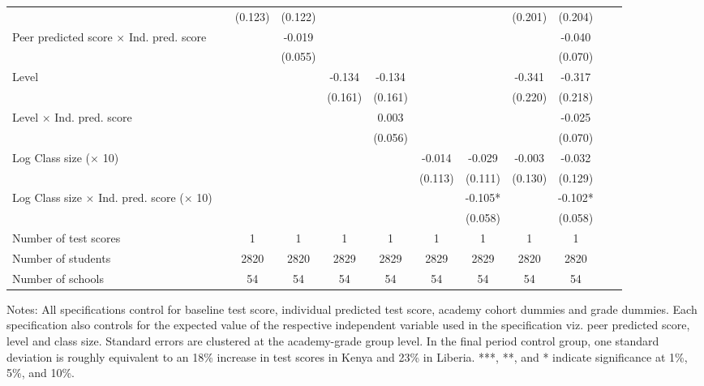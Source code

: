 \begin{center}
\begin{scriptsize}
\begin{threeparttable}
\begin{tabular} {@{} l l c c c c c c c c c c  @{}}
                 &  & (0.123) & (0.122) &  &  &  &  & (0.201) & (0.204) \\
Peer predicted score $\times$ Ind. pred. score &  &  & -0.019 &  &  &  &  &  & -0.040 \\
                 &  &  & (0.055) &  &  &  &  &  & (0.070) \\
Level &  &  &  & -0.134 & -0.134 &  &  & -0.341 & -0.317 \\
                 &  &  &  & (0.161) & (0.161) &  &  & (0.220) & (0.218) \\
Level $\times$ Ind. pred. score &  &  &  &  & 0.003 &  &  &  & -0.025 \\
                 &  &  &  &  & (0.056) &  &  &  & (0.070) \\
Log Class size ($\times$ 10) &  &  &  &  &  & -0.014 & -0.029 & -0.003 & -0.032 \\
                 &  &  &  &  &  & (0.113) & (0.111) & (0.130) & (0.129) \\
Log Class size $\times$ Ind. pred. score ($\times$ 10) &  &  &  &  &  &  & -0.105* &  & -0.102* \\
                 &  &  &  &  &  &  & (0.058) &  & (0.058) \\
\midrule
Number of test scores &  & 1 & 1 & 1 & 1 & 1 & 1 & 1 & 1 \\
Number of students &  & 2820 & 2820 & 2829 & 2829 & 2829 & 2829 & 2820 & 2820 \\
Number of schools &  & 54 & 54 & 54 & 54 & 54 & 54 & 54 & 54 \\
\bottomrule
\end{tabular}
\begin{tablenotes}
\item Notes: All specifications control for baseline test score, individual predicted test score, academy cohort dummies and grade dummies. Each specification also controls for the expected value of the respective independent variable used in the specification viz. peer predicted score, level and class size. Standard errors are clustered at the academy-grade group level. In the final period control group, one standard deviation is roughly equivalent to an 18\% increase in test scores in Kenya and 23\% in Liberia. ***, **, and * indicate significance at 1\%, 5\%, and 10\%.\end{tablenotes}
\end{threeparttable}
\end{scriptsize}
\end{center}
\clearpage
